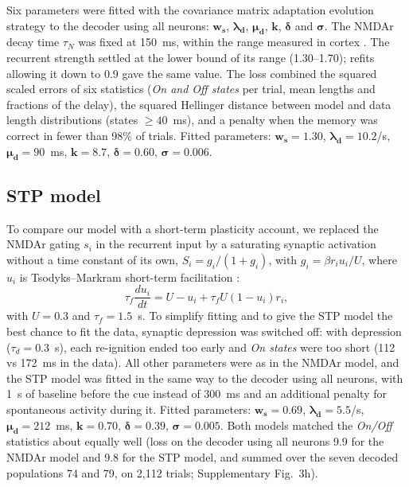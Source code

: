 \documentclass[11pt]{article}
\begin{document}
Six parameters were fitted with the covariance matrix adaptation evolution strategy \citep{hansen2001} to the decoder using all neurons: $\bm{w_s}$, $\bm{\lambda_d}$, $\bm{\mu_d}$, $\bm{k}$, $\bm{\delta}$ and $\bm{\sigma}$.
The NMDAr decay time $\tau_N$ was fixed at 150~ms, within the range measured in cortex \citep{vicini1998,wangh2008,wangm2013}. The recurrent strength settled at the lower bound of its range (1.30--1.70); refits allowing it down to 0.9 gave the same value.
The loss combined the squared scaled errors of six statistics (\emph{On and Off states} per trial, mean lengths and fractions of the delay), the squared Hellinger distance between model and data length distributions (states $\geq 40$~ms), and a penalty when the memory was correct in fewer than 98\% of trials.
Fitted parameters: $\bm{w_s} = 1.30$, $\bm{\lambda_d} = 10.2$/s, $\bm{\mu_d} = 90$~ms, $\bm{k} = 8.7$, $\bm{\delta} = 0.60$, $\bm{\sigma} = 0.006$.

\subsection{STP model}

To compare our model with a short-term plasticity account, we replaced the NMDAr gating $s_i$ in the recurrent input by a saturating synaptic activation without a time constant of its own, $S_i = g_i/(1 + g_i)$, with $g_i = \beta r_i u_i/U$, where $u_i$ is Tsodyks--Markram short-term facilitation \citep{mongillo2008,mi2017}:
\begin{equation*}
  \tau_f \frac{du_i}{dt} = U - u_i + \tau_f U (1 - u_i) r_i,
\end{equation*}
with $U = 0.3$ and $\tau_f = 1.5$~s. To simplify fitting and to give the STP model the best chance to fit the data, synaptic depression was switched off: with depression ($\tau_d = 0.3$~s), each re-ignition ended too early and \emph{On states} were too short (112 vs 172~ms in the data). All other parameters were as in the NMDAr model, and the STP model was fitted in the same way to the decoder using all neurons, with 1~s of baseline before the cue instead of 300~ms and an additional penalty for spontaneous activity during it. Fitted parameters: $\bm{w_s} = 0.69$, $\bm{\lambda_d} = 5.5$/s, $\bm{\mu_d} = 212$~ms, $\bm{k} = 0.70$, $\bm{\delta} = 0.39$, $\bm{\sigma} = 0.005$. Both models matched the \emph{On/Off} statistics about equally well (loss on the decoder using all neurons 9.9 for the NMDAr model and 9.8 for the STP model, and summed over the seven decoded populations 74 and 79, on 2,112 trials; Supplementary Fig.~3h).
\end{document}
